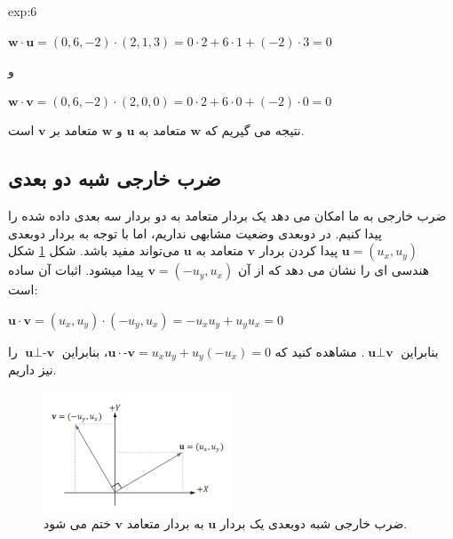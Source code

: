 {\begin{spacing}{1.5}
\begin{example}{exp:6}
            \begin{center}
                $\textbf{w}\cdot\textbf{u}=(0,6,-2)\cdot(2,1,3)=0\cdot 2+6\cdot 1+(-2)\cdot 3=0$

                و

                $\textbf{w}\cdot\textbf{v}=(0,6,-2)\cdot(2,0,0)=0\cdot 2+6\cdot 0+(-2)\cdot 0=0$
            \end{center}

            نتیجه می گیریم که $\textbf{w}$ متعامد به $\textbf{u}$ و $\textbf{w}$ متعامد بر $\textbf{v}$ است.
        \end{example}
    \end{spacing}
}

\subsection{\textbf{ضرب خارجی شبه دو بعدی}}
{
    \Large
    \begin{spacing}{1.5}
        ضرب خارجی به ما امکان می دهد یک بردار متعامد به دو بردار سه بعدی داده شده را پیدا کنیم.
        در دوبعدی وضعیت مشابهی نداریم،
        اما با توجه به بردار دوبعدی $\textbf{u}=(u_{x},u_{y})$ پیدا کردن بردار $\textbf{v}$ متعامد به $\textbf{u}$ می‌تواند مفید باشد.
        شکل \ref{fig:4.Session.1.1.14} شکل هندسی ای را نشان می دهد که از آن $\textbf{v}=(-u_{y},u_{x})$ پیدا میشود.
        اثبات آن ساده است:

        \begin{center}
            $\textbf{u}\cdot\textbf{v}=(u_{x},u_{y})\cdot(-u_{y},u_{x})=-u_{x}u_{y}+u_{y}u_{x}=0$
        \end{center}

        بنابراین $\textbf{u}\perp\textbf{v}$.
        مشاهده کنید که $\textbf{u}\cdot\textbf{-v}=u_{x}u_{y}+u_{y}(-u_{x})=0$، بنابراین $\textbf{u}\perp\textbf{-v}$ را نیز داریم.

        \begin{figure}[H]
            \centering
            \setlength{\belowcaptionskip}{-10pt}
            \includegraphics[width=0.5\textwidth]{Images/4/4.Session.1.1.14}
            \caption{ضرب خارجی شبه دوبعدی یک بردار $\textbf{u}$ به بردار متعامد $\textbf{v}$ ختم می شود.}
            \label{fig:4.Session.1.1.14}
        \end{figure}
    \end{spacing}
}

